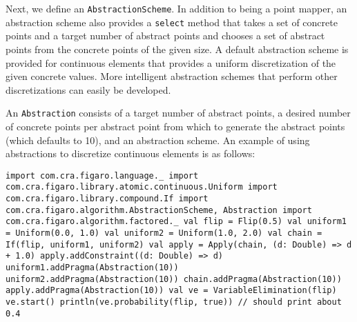 Next, we define an \texttt{AbstractionScheme}. In addition to being a point mapper, an abstraction scheme also provides a \texttt{select} method that takes a set of concrete points and a target number of abstract points and chooses a set of abstract points from the concrete points of the given size. A default abstraction scheme is provided for continuous elements that provides a uniform discretization of the given concrete values. More intelligent abstraction schemes that perform other discretizations can easily be developed.

An \texttt{Abstraction} consists of a target number of abstract points, a desired number of concrete points per abstract point from which to generate the abstract points (which defaults to 10), and an abstraction scheme. An example of using abstractions to discretize continuous elements is as follows:

\begin{flushleft}
\texttt{import com.cra.figaro.language.\_
\newline import com.cra.figaro.library.atomic.continuous.Uniform
\newline import com.cra.figaro.library.compound.If
\newline import com.cra.figaro.algorithm.{AbstractionScheme, Abstraction}
\newline import com.cra.figaro.algorithm.factored.\_
\newline 
\newline val flip = Flip(0.5)
\newline val uniform1 = Uniform(0.0, 1.0)
\newline val uniform2 = Uniform(1.0, 2.0)
\newline val chain = If(flip, uniform1, uniform2)
\newline val apply = Apply(chain, (d: Double) => d + 1.0)
\newline apply.addConstraint((d: Double) => d)
\newline 
\newline uniform1.addPragma(Abstraction(10)) 
\newline uniform2.addPragma(Abstraction(10)) 
\newline chain.addPragma(Abstraction(10)) 
\newline apply.addPragma(Abstraction(10))
\newline 
\newline val ve = VariableElimination(flip)
\newline ve.start()
\newline println(ve.probability(flip, true)) 
\newline // should print about 0.4 }
\end{flushleft}

